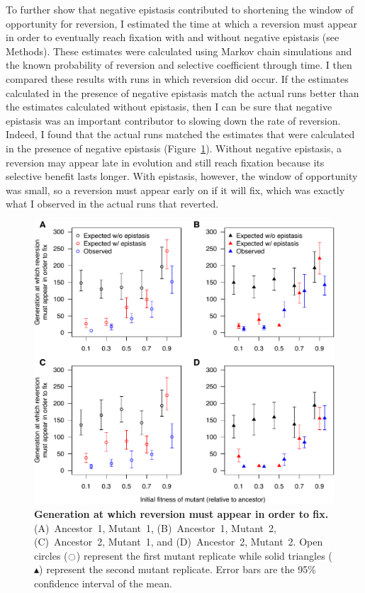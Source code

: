 \begin{doublespace}
To further show that negative epistasis contributed
to shortening the window of opportunity for reversion,
I estimated the time at which a reversion must appear
in order to eventually reach fixation
with and without negative epistasis (see Methods).
%
These estimates were calculated using Markov chain simulations
and the known probability of reversion and selective coefficient through time.
%
I then compared these results with runs in which reversion did occur.
%
If the estimates calculated in the presence of negative epistasis
match the actual runs better than the estimates calculated without epistasis,
then I can be sure that negative epistasis
was an important contributor to slowing down the rate of reversion.
%
Indeed, I found that the actual runs matched the estimates
that were calculated in the presence of negative epistasis
(Figure~\ref{fig:expected-rev}).
%
Without negative epistasis, a reversion may appear late in evolution
and still reach fixation because its selective benefit lasts longer.
%
With epistasis, however, the window of opportunity was small,
so a reversion must appear early on if it will fix,
which was exactly what I observed in the actual runs that reverted.



\begin{figure}
\begin{center}
\includegraphics[width=\linewidth]{expected-rev.pdf}
\end{center}
\caption{{\bf Generation at which reversion must appear in order to fix.}
  (A)~Ancestor~1, Mutant~1, (B)~Ancestor~1, Mutant~2,
  (C)~Ancestor~2, Mutant~1, and (D)~Ancestor~2, Mutant~2.
  Open circles ($\ocircle$) represent the first mutant replicate
  while solid triangles ($\blacktriangle$)
  represent the second mutant replicate.
  Error bars are the 95\% confidence interval of the mean.}
\label{fig:expected-rev}
\end{figure}




\end{doublespace}
